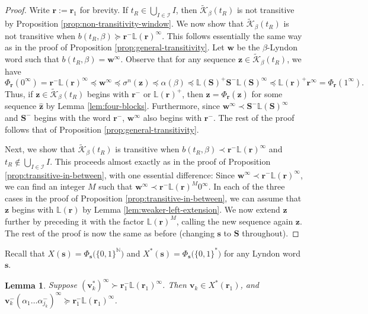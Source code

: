 \documentclass[11pt]{amsart}
\newtheorem{lemma}[theorem]{Lemma}
\theoremstyle{definition}
\theoremstyle{remark}
\numberwithin{equation}{section}
\newcommand{\N}{\ensuremath{\mathbb{N}}}
\renewcommand{\L}{\ensuremath{\mathbb{L}}}
\newcommand{\II}{\mathcal{I}}
\newcommand{\Kt}{\widetilde{\mathcal{K}}}
\newcommand{\s}{ {\mathbf{s}}}
\newcommand{\cs}{ {\mathbf{S}}}
\renewcommand{\r}{ {\mathbf{r}}}
\renewcommand{\v}{\mathbf{v}}
\newcommand{\w}{\mathbf{w}}
\newcommand{\z}{\mathbf{z}}
\newcommand{\f}{\infty}
\newcommand{\al}{\alpha}
\newcommand{\lle}{\preccurlyeq}
\newcommand{\lge}{\succcurlyeq}
\newcommand{\si}{\sigma}
\begin{document}
\begin{proof}
Write $\r:=\r_1$ for brevity. If $t_R\in\bigcup_{I\in\II}I$, then $\Kt_\beta(t_R)$ is not transitive by Proposition \ref{prop:non-transitivity-window}. We now show that $\Kt_\beta(t_R)$ is not transitive when $b(t_R,\beta)\lge \r^-\L(\r)^\f$. This follows essentially the same way as in the proof of Proposition \ref{prop:general-transitivity}. Let $\w$ be the $\beta$-Lyndon word such that $b(t_R,\beta)=\w^\f$. Observe that for any sequence $\z\in\Kt_\beta(t_R)$, we have
\[
\Phi_\r(0^\f)=\r^-\L(\r)^\f\lle \w^\f \lle \si^n(\z) \lle \al(\beta) \lle \L(\cs)^+\cs^-\L(\cs)^\f \lle \L(\r)^+\r^\f=\Phi_\r(1^\f).
\]
Thus, if $\z\in\Kt_\beta(t_R)$ begins with $\r^-$ or $\L(\r)^+$, then $\z=\Phi_\r(\hat{\z})$ for some sequence $\hat{\z}$ by Lemma \ref{lem:four-blocks}. Furthermore, since $\w^\f\prec \cs^-\L(\cs)^\f$ and $\cs^-$ begins with the word $\r^-$, $\w^\f$ also begins with $\r^-$. The rest of the proof follows that of Proposition \ref{prop:general-transitivity}.

\medskip

Next, we show that $\Kt_\beta(t_R)$ is transitive when $b(t_R,\beta)\prec \r^-\L(\r)^\f$ and $t_R\not\in\bigcup_{I\in\II}I$. This proceeds almost exactly as in the proof of Proposition \ref{prop:transitive-in-between}, with one essential difference: Since $\w^\f\prec\r^-\L(\r)^\f$, we can find an integer $M$ such that $\w^\f\prec\r^-\L(\r)^M 0^\f$. In each of the three cases in the proof of Proposition \ref{prop:transitive-in-between}, we can assume that $\z$ begins with $\L(\r)$ by Lemma \ref{lem:weaker-left-extension}. We now extend $\z$ further by preceding it with the factor $\L(\r)^M$, calling the new sequence again $\z$. The rest of the proof is now the same as before (changing $\s$ to $\cs$ throughout).
\end{proof}

Recall that $X(\s)=\Phi_\s\big(\{0,1\}^\N\big)$ and $X^*(\s)=\Phi_\s\big(\{0,1\}^*\big)$ for any Lyndon word $\s$.

\begin{lemma} \label{lem:v_k-four-blocks}
Suppose $(\v_k^*)^\f\succ \r_1^-\L(\r_1)^\f$. Then $\v_k\in X^*(\r_1)$, and $\v_k^-(\al_1\dots\al_{j_k}^-)^\f\lge \r_1^-\L(\r_1)^\f$.
\end{lemma}
\end{document}
